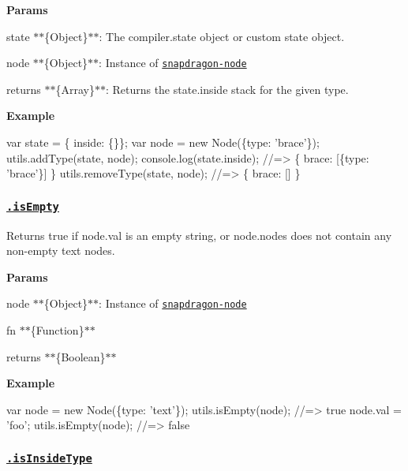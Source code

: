 {\bfseries Params}


\begin{DoxyItemize}
\item {\ttfamily state} $\ast$$\ast$\{Object\}$\ast$$\ast$\+: The {\ttfamily compiler.\+state} object or custom state object.
\item {\ttfamily node} $\ast$$\ast$\{Object\}$\ast$$\ast$\+: Instance of \href{https://github.com/jonschlinkert/snapdragon-node}{\tt snapdragon-\/node}
\item {\ttfamily returns} $\ast$$\ast$\{Array\}$\ast$$\ast$\+: Returns the {\ttfamily state.\+inside} stack for the given type.
\end{DoxyItemize}

{\bfseries Example}


\begin{DoxyCode}
var state = \{ inside: \{\}\};
var node = new Node(\{type: 'brace'\});
utils.addType(state, node);
console.log(state.inside);
//=> \{ brace: [\{type: 'brace'\}] \}
utils.removeType(state, node);
//=> \{ brace: [] \}
\end{DoxyCode}


\subsubsection*{\href{index.js#L788}{\tt .is\+Empty}}

Returns true if {\ttfamily node.\+val} is an empty string, or {\ttfamily node.\+nodes} does not contain any non-\/empty text nodes.

{\bfseries Params}


\begin{DoxyItemize}
\item {\ttfamily node} $\ast$$\ast$\{Object\}$\ast$$\ast$\+: Instance of \href{https://github.com/jonschlinkert/snapdragon-node}{\tt snapdragon-\/node}
\item {\ttfamily fn} $\ast$$\ast$\{Function\}$\ast$$\ast$
\item {\ttfamily returns} $\ast$$\ast$\{Boolean\}$\ast$$\ast$
\end{DoxyItemize}

{\bfseries Example}


\begin{DoxyCode}
var node = new Node(\{type: 'text'\});
utils.isEmpty(node); //=> true
node.val = 'foo';
utils.isEmpty(node); //=> false
\end{DoxyCode}


\subsubsection*{\href{index.js#L833}{\tt .is\+Inside\+Type}}

